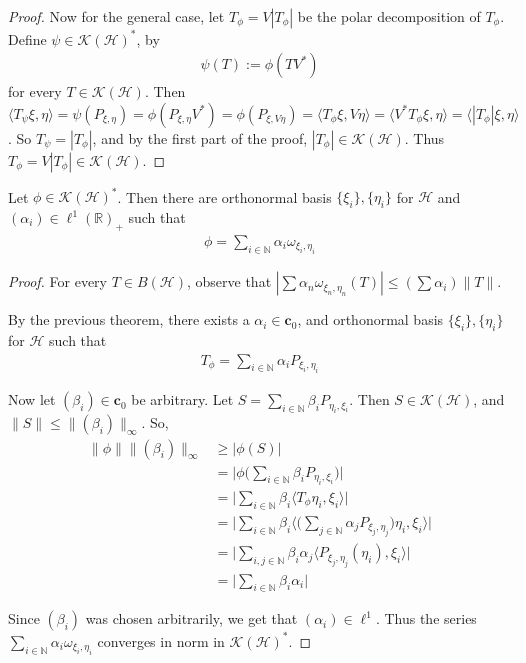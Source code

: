\begin{proof}
  Now for the general case, let $T_\phi = V |T_\phi|$ be the polar
  decomposition of $T_\phi$. Define $\psi \in \mathcal{K}(\mathcal{H})^*$, by
  \begin{align*}
    \psi(T) := \phi(TV^*)
  \end{align*}
  for every $T \in \mathcal{K}(\mathcal{H})$. Then $\langle T_\psi
  \xi, \eta \rangle = \psi(P_{\xi, \eta}) = \phi(P_{\xi, \eta}V^*) =
  \phi(P_{ \xi, V\eta}) = \langle   T_\phi  \xi ,  V\eta \rangle =
  \langle V^* T_\phi \xi ,  \eta \rangle = \langle |T_\phi| \xi ,
  \eta \rangle$. So $T_\psi = |T_\phi|$, and by the first part of the
  proof, $|T_\phi| \in \mathcal{K}(\mathcal{H})$. Thus $T_\phi = V
  |T_\phi| \in \mathcal{K}(\mathcal{H})$.
\end{proof}

\begin{theorem}
  Let $\phi \in \mathcal{K}(\mathcal{H})^*$. Then there are
  orthonormal basis $\{ \xi_i \}, \{ \eta_i \}$ for $ \mathcal{H}$
  and $(\alpha_i) \in \ell^{1}(\mathbb{R})_{+}$ such that
  \begin{align*}
    \phi = \sum_{i \in \mathbb{N}} \alpha_i \omega_{\xi_i, \eta_i}
  \end{align*}
\end{theorem}
\begin{proof}
  For every $T \in B(\mathcal{H})$, observe that $|\sum \alpha_n
  \omega_{\xi_n, \eta_n}(T)| \le (\sum \alpha_i) \| T\|$.

  By the previous theorem, there exists a $\alpha_i \in
  \textbf{c}_0$, and orthonormal basis $\{ \xi_i \}, \{ \eta_i \}$
  for $\mathcal{H}$ such that
  \begin{align*}
    T_\phi = \sum_{i \in \mathbb{N}} \alpha_i P_{\xi_i, \eta_i}
  \end{align*}

  Now let $(\beta_i) \in \textbf{c}_0$ be arbitrary. Let $S = \sum_{i
  \in \mathbb{N}} \beta_i P_{\eta_i, \xi_i}$. Then $ S \in
  \mathcal{K}(\mathcal{H})$, and $\|S\| \le \|(\beta_i)\|_\infty$. So,
  \begin{align*}
    \|\phi\| \|(\beta_i)\|_\infty & \ge |\phi(S)| \\
    &= \Bigg | \phi \Big( \sum_{i \in \mathbb{N}} \beta_iP_{\eta_i,
    \xi_i}\Big) \Bigg | \\
    &= \Big | \sum_{i \in \mathbb{N}} \beta_i \langle T_\phi \eta_i ,
    \xi_i \rangle \Big | \\
    &= \Big | \sum_{i \in \mathbb{N}} \beta_i \big \langle \big(
    \sum_{j \in \mathbb{N}} \alpha_j P_{\xi_j, \eta_j}\bigg) \eta_i ,
    \xi_i \bigg \rangle \Big | \\
    &= \Big | \sum_{i, j \in \mathbb{N}} \beta_i \alpha_j \langle
    P_{\xi_j, \eta_j}(\eta_i) ,  \xi_i \rangle \Big | \\
    &= \Big | \sum_{i \in \mathbb{N}} \beta_i \alpha_i \Big |
  \end{align*}

  Since $(\beta_i)$ was chosen arbitrarily, we get that $(\alpha_i)
  \in \ell^{1}$. Thus the series $\sum_{i \in \mathbb{N}} \alpha_i
  \omega_{\xi_i, \eta_i}$ converges in norm in $\mathcal{K}(\mathcal{H})^*$.
\end{proof}

